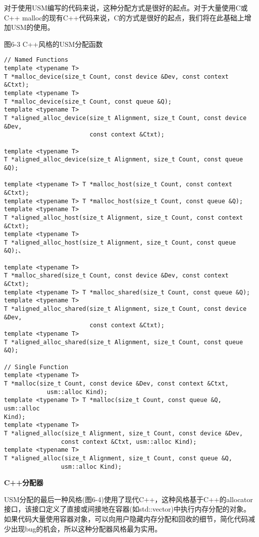 对于使用USM编写的代码来说，这种分配方式是很好的起点。对于大量使用C或C++ malloc的现有C++代码来说，C的方式是很好的起点，我们将在此基础上增加USM的使用。\par

\hspace*{\fill} \par %
图6-3 C++风格的USM分配函数
\begin{lstlisting}[caption={}]
// Named Functions
template <typename T>
T *malloc_device(size_t Count, const device &Dev, const context &Ctxt); 
template <typename T> 
T *malloc_device(size_t Count, const queue &Q); 
template <typename T>
T *aligned_alloc_device(size_t Alignment, size_t Count, const device &Dev,
						const context &Ctxt); 

template <typename T>
T *aligned_alloc_device(size_t Alignment, size_t Count, const queue &Q); 

template <typename T> T *malloc_host(size_t Count, const context &Ctxt);
template <typename T> T *malloc_host(size_t Count, const queue &Q);
template <typename T>
T *aligned_alloc_host(size_t Alignment, size_t Count, const context &Ctxt);
template <typename T>
T *aligned_alloc_host(size_t Alignment, size_t Count, const queue &Q);、

template <typename T>
T *malloc_shared(size_t Count, const device &Dev, const context &Ctxt);
template <typename T> T *malloc_shared(size_t Count, const queue &Q);
template <typename T>
T *aligned_alloc_shared(size_t Alignment, size_t Count, const device &Dev,
						const context &Ctxt);				
template <typename T>
T *aligned_alloc_shared(size_t Alignment, size_t Count, const queue &Q);

// Single Function
template <typename T>
T *malloc(size_t Count, const device &Dev, const context &Ctxt,
			usm::alloc Kind);
template <typename T> T *malloc(size_t Count, const queue &Q, usm::alloc
Kind);
template <typename T>
T *aligned_alloc(size_t Alignment, size_t Count, const device &Dev,
				const context &Ctxt, usm::alloc Kind);
template <typename T>
T *aligned_alloc(size_t Alignment, size_t Count, const queue &Q,
				usm::alloc Kind);
\end{lstlisting}

\hspace*{\fill} \par %
\textbf{C++分配器}

USM分配的最后一种风格(图6-4)使用了现代C++，这种风格基于C++的allocator接口，该接口定义了直接或间接地在容器(如std::vector)中执行内存分配的对象。如果代码大量使用容器对象，可以向用户隐藏内存分配和回收的细节，简化代码减少出现bug的机会，所以这种分配器风格最为实用。\par

